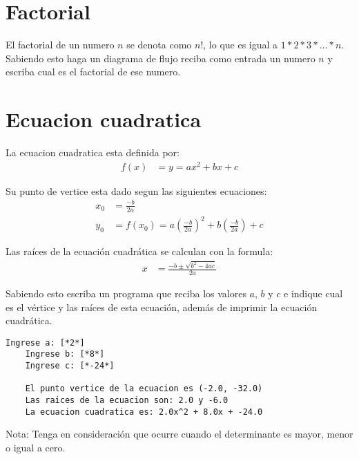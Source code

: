 
\section{Factorial}

El factorial de un numero $n$ se denota como $n!$, lo que es igual a  $1*2*3*...*n$. Sabiendo esto haga un diagrama de flujo reciba como entrada un numero $n$ y escriba cual es el factorial de ese numero.

\section{Ecuacion cuadratica}

La ecuacion cuadratica esta definida por:
\begin{align*}
    f(x) &= y = ax^2 + bx + c
\end{align*}

Su punto de vertice esta dado segun las siguientes ecuaciones:
\begin{align*}
    x_0 &= \frac{-b}{2a} \\
    y_0 &= f(x_0) = a\left(\frac{-b}{2a}\right)^{2} + b\left(\frac{-b}{2a}\right) + c
\end{align*}

Las raíces de la ecuación cuadrática se calculan con la formula:
\begin{align*}
    x &= \frac{-b \pm \sqrt{b^2 - 4ac}}{2a}
\end{align*}

Sabiendo esto escriba un programa que reciba los valores $a$, $b$ y $c$ e indique cual es el vértice y las raíces de esta ecuación, además de imprimir la ecuación cuadrática.

\begin{lstlisting}[style=consola]
    Ingrese a: [*2*]
    Ingrese b: [*8*]
    Ingrese c: [*-24*]
    
    El punto vertice de la ecuacion es (-2.0, -32.0)
    Las raices de la ecuacion son: 2.0 y -6.0
    La ecuacion cuadratica es: 2.0x^2 + 8.0x + -24.0
\end{lstlisting}

Nota: Tenga en consideración que ocurre cuando el determinante es mayor, menor o igual a cero.

